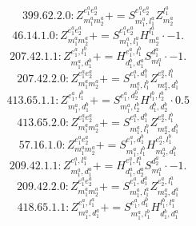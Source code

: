 \documentclass[letterpaper,10pt,fleqn,leqno,onecolumn]{article}
\begin{document}
\begin{equation} \;\;\;\;\;\;  399.62.2.0: Z^{e_{1}^{a}e_{2}^{a}}_{m_{1}^{a}m_{2}^{a}}+=S^{e_{1}^{a}e_{2}^{a}}_{m_{1}^{a},l_{1}^{a}}Z^{l_{1}^{a}}_{m_{2}^{a}} \end{equation}
\begin{equation} \;\;\;\;\;\;  46.14.1.0: Z^{e_{1}^{a}e_{2}^{a}}_{m_{1}^{a}m_{2}^{a}}+=S^{e_{1}^{a}e_{2}^{a}}_{m_{1}^{a},l_{1}^{a}}H^{l_{1}^{a}}_{m_{2}^{a}}\cdot -1. \end{equation}
\begin{equation} \;\;\;\;\;\;  207.42.1.1: Z^{e_{1}^{a},l_{1}^{b}}_{m_{1}^{a},d_{1}^{b}}+=H^{e_{1}^{a},l_{1}^{b}}_{d_{1}^{b},d_{1}^{a}}S^{d_{1}^{a}}_{m_{1}^{a}}\cdot -1. \end{equation}
\begin{equation} \;\;\;\;\;\;  207.42.2.0: Z^{e_{1}^{a}e_{2}^{a}}_{m_{1}^{a}m_{2}^{a}}+=S^{e_{1}^{a},d_{1}^{b}}_{m_{1}^{a},l_{1}^{b}}Z^{e_{2}^{a},l_{1}^{b}}_{m_{2}^{a},d_{1}^{b}} \end{equation}
\begin{equation} \;\;\;\;\;\;  413.65.1.1: Z^{e_{1}^{a},l_{1}^{b}}_{m_{1}^{a},d_{1}^{b}}+=S^{e_{1}^{a},d_{2}^{b}}_{m_{1}^{a},l_{2}^{b}}H^{l_{1}^{b},l_{2}^{b}}_{d_{1}^{b},d_{2}^{b}}\cdot 0.5 \end{equation}
\begin{equation} \;\;\;\;\;\;  413.65.2.0: Z^{e_{1}^{a}e_{2}^{a}}_{m_{1}^{a}m_{2}^{a}}+=S^{e_{1}^{a},d_{1}^{b}}_{m_{1}^{a},l_{1}^{b}}Z^{e_{2}^{a},l_{1}^{b}}_{m_{2}^{a},d_{1}^{b}} \end{equation}
\begin{equation} \;\;\;\;\;\;  57.16.1.0: Z^{e_{1}^{a}e_{2}^{a}}_{m_{1}^{a}m_{2}^{a}}+=S^{e_{1}^{a},d_{1}^{b}}_{m_{1}^{a},l_{1}^{b}}H^{e_{2}^{a},l_{1}^{b}}_{m_{2}^{a},d_{1}^{b}} \end{equation}
\begin{equation} \;\;\;\;\;\;  209.42.1.1: Z^{e_{1}^{a},l_{1}^{a}}_{m_{1}^{a},d_{1}^{a}}+=H^{e_{1}^{a},l_{1}^{a}}_{d_{1}^{a},d_{2}^{a}}S^{d_{2}^{a}}_{m_{1}^{a}}\cdot -1. \end{equation}
\begin{equation} \;\;\;\;\;\;  209.42.2.0: Z^{e_{1}^{a}e_{2}^{a}}_{m_{1}^{a}m_{2}^{a}}+=S^{e_{1}^{a},d_{1}^{a}}_{m_{1}^{a},l_{1}^{a}}Z^{e_{2}^{a},l_{1}^{a}}_{m_{2}^{a},d_{1}^{a}} \end{equation}
\begin{equation} \;\;\;\;\;\;  418.65.1.1: Z^{e_{1}^{a},l_{1}^{a}}_{m_{1}^{a},d_{1}^{a}}+=S^{e_{1}^{a},d_{1}^{b}}_{m_{1}^{a},l_{1}^{b}}H^{l_{1}^{b},l_{1}^{a}}_{d_{1}^{b},d_{1}^{a}} \end{equation}
\end{document}
